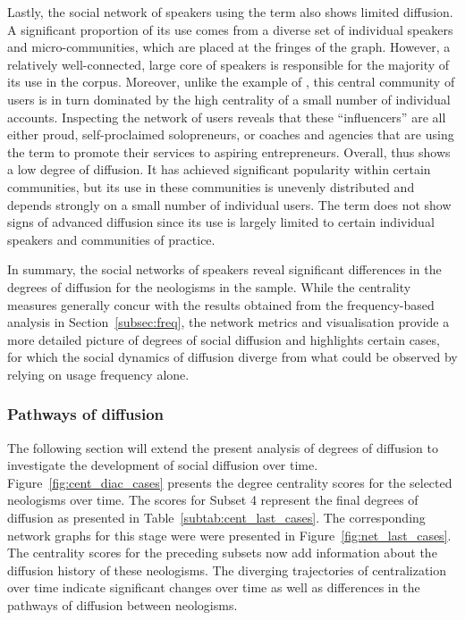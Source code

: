 \documentclass[
  a4paper,
  abstract=on,
  captions=tableabove
  ]{scrartcl}
\begin{document}
      Lastly, the social network of speakers using the term  also shows limited diffusion. A significant proportion of its use comes from a diverse set of individual speakers and micro-communities, which are placed at the fringes of the graph. However, a relatively well-connected, large core of speakers is responsible for the majority of its use in the corpus. Moreover, unlike the example of , this central community of users is in turn dominated by the high centrality of a small number of individual accounts. Inspecting the network of users reveals that these \enquote{influencers} are all either proud, self-proclaimed solopreneurs, or coaches and agencies that are using the term to promote their services to aspiring entrepreneurs. Overall,  thus shows a low degree of diffusion. It has achieved significant popularity within certain communities, but its use in these communities is unevenly distributed and depends strongly on a small number of individual users. The term does not show signs of advanced diffusion since its use is largely limited to certain individual speakers and communities of practice.

      In summary, the social networks of speakers reveal significant differences in the degrees of diffusion for the neologisms in the sample. While the centrality measures generally concur with the results obtained from the frequency-based analysis in Section~\ref{subsec:freq}, the network metrics and visualisation provide a more detailed picture of degrees of social diffusion and highlights certain cases, for which the social dynamics of diffusion diverge from what could be observed by relying on usage frequency alone.


    \subsubsection{Pathways of diffusion}

      The following section will extend the present analysis of degrees of diffusion to investigate the development of social diffusion over time. Figure~\ref{fig:cent_diac_cases} presents the degree centrality scores for the selected neologisms over time. The scores for Subset 4 represent the final degrees of diffusion as presented in Table~\ref{subtab:cent_last_cases}. The corresponding network graphs for this stage were were presented in Figure~\ref{fig:net_last_cases}. The centrality scores for the preceding subsets now add information about the diffusion history of these neologisms. The diverging trajectories of centralization over time indicate significant changes over time as well as differences in the pathways of diffusion between neologisms.
\end{document}
